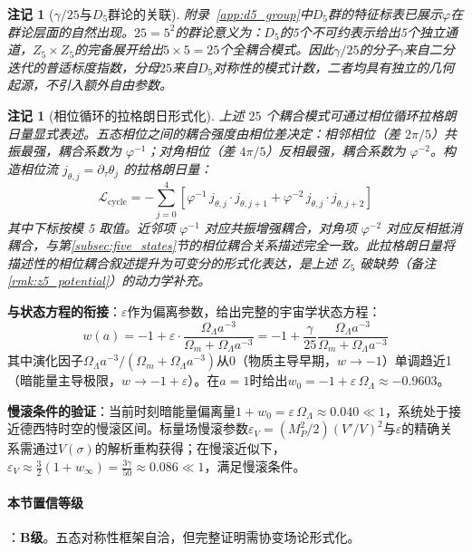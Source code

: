 \documentclass[12pt,a4paper,twocolumn]{article}
\renewcommand{\phi}{\varphi}
\newtheorem{remark}[theorem]{注记}
\begin{document}
\begin{remark}[$\gamma/25$与$D_5$群论的关联]
附录~\ref{app:d5_group}中$D_5$群的特征标表已展示$\phi$在群论层面的自然出现。$25=5^2$的群论意义为：$D_5$的5个不可约表示给出5个独立通道，$Z_5 \times Z_5$的完备展开给出$5 \times 5 = 25$个全耦合模式。因此$\gamma/25$的分子$\gamma$来自二分迭代的普适标度指数，分母$25$来自$D_5$对称性的模式计数，二者均具有独立的几何起源，不引入额外自由参数。
\end{remark}

\begin{remark}[相位循环的拉格朗日形式化]
\label{rmk:phase_circulation}
上述 $25$ 个耦合模式可通过相位循环拉格朗日量显式表述。五态相位之间的耦合强度由相位差决定：相邻相位（差 $2\pi/5$）共振最强，耦合系数为 $\phi^{-1}$；对角相位（差 $4\pi/5$）反相最强，耦合系数为 $\phi^{-2}$。构造相位流 $j_{\theta,j} = \partial_\tau\theta_j$ 的拉格朗日量：
\begin{equation}
\mathcal{L}_{\text{cycle}} = -\sum_{j=0}^{4} \left[ \phi^{-1}\, j_{\theta,j} \cdot j_{\theta,j+1} + \phi^{-2}\, j_{\theta,j} \cdot j_{\theta,j+2} \right]
\end{equation}
其中下标按模 5 取值。近邻项 $\phi^{-1}$ 对应共振增强耦合，对角项 $\phi^{-2}$ 对应反相抵消耦合，与第\ref{subsec:five_states}节的相位耦合关系描述完全一致。此拉格朗日量将描述性的相位耦合叙述提升为可变分的形式化表达，是上述 $Z_5$ 破缺势（备注\ref{rmk:z5_potential}）的动力学补充。
\end{remark}

\textbf{与状态方程的衔接}：$\varepsilon$作为偏离参数，给出完整的宇宙学状态方程：
\[
w(a) = -1 + \varepsilon \cdot \frac{\Omega_\Lambda a^{-3}}{\Omega_m + \Omega_\Lambda a^{-3}} = -1 + \frac{\gamma}{25}\frac{\Omega_\Lambda a^{-3}}{\Omega_m + \Omega_\Lambda a^{-3}}
\]
其中演化因子$\Omega_\Lambda a^{-3}/(\Omega_m + \Omega_\Lambda a^{-3})$从0（物质主导早期，$w\to-1$）单调趋近1（暗能量主导极限，$w\to-1+\varepsilon$）。在$a=1$时给出$w_0 = -1 + \varepsilon\,\Omega_\Lambda \approx -0.9603$。

\textbf{慢滚条件的验证}：当前时刻暗能量偏离量$1+w_0 = \varepsilon\,\Omega_\Lambda \approx 0.040 \ll 1$，系统处于接近德西特时空的慢滚区间。标量场慢滚参数$\varepsilon_V = (M_P^2/2)(V'/V)^2$与$\varepsilon$的精确关系需通过$V(\sigma)$的解析重构获得；在慢滚近似下，$\varepsilon_V \approx \frac{3}{2}(1+w_\infty) = \frac{3\gamma}{50} \approx 0.086 \ll 1$，满足慢滚条件。

\paragraph{本节置信等级}：\textbf{B级}。五态对称性框架自洽，但完整证明需协变场论形式化。
\end{document}
